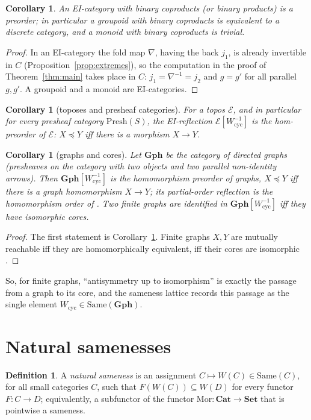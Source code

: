 \documentclass[11pt]{amsart}
\newtheorem{cor}[thm]{Corollary}
\theoremstyle{definition}
\newtheorem{defi}[thm]{Definition}
\newcommand{\Same}{\mathrm{Same}}
\newcommand{\Mor}{\mathrm{Mor}}
\newcommand{\Wcyc}{W_{\mathrm{cyc}}}
\newcommand{\Cat}{\mathbf{Cat}}
\newcommand{\Set}{\mathbf{Set}}
\newcommand{\Presh}{\mathrm{Presh}}
\begin{document}
\begin{cor}\label{cor:EIco}
An EI-category with binary coproducts (or binary products) is a preorder;
in particular a groupoid with binary coproducts is equivalent to a discrete
category, and a monoid with binary coproducts is trivial.
\end{cor}
\begin{proof}
In an EI-category the fold map $\nabla$, having the back $j_1$, is already
invertible in $C$ (Proposition~\ref{prop:extremes}), so the computation in
the proof of Theorem~\ref{thm:main} takes place in $C$: $j_1=\nabla^{-1}=j_2$
and $g=g'$ for all parallel $g,g'$. A groupoid and a monoid are
EI-categories.
\end{proof}

\begin{cor}[toposes and presheaf categories]\label{cor:topos}
For a topos $\mathcal E$, and in particular for every presheaf category
$\Presh(S)$, the EI-reflection $\mathcal E[\Wcyc^{-1}]$ is the hom-preorder
of $\mathcal E$: $X\preceq Y$ iff there is a morphism $X\to Y$.
\end{cor}

\begin{cor}[graphs and cores]\label{cor:graphs}
Let $\mathbf{Gph}$ be the category of directed graphs (presheaves on the
category with two objects and two parallel non-identity arrows). Then
$\mathbf{Gph}[\Wcyc^{-1}]$ is the homomorphism preorder of graphs, $X\preceq Y$
iff there is a graph homomorphism $X\to Y$; its partial-order reflection is
the homomorphism order of \cite{HN}. Two finite graphs are identified in
$\mathbf{Gph}[\Wcyc^{-1}]$ iff they have isomorphic cores.
\end{cor}
\begin{proof}
The first statement is Corollary~\ref{cor:topos}. Finite graphs $X,Y$ are
mutually reachable iff they are homomorphically equivalent, iff their
cores are isomorphic \cite[Ch.~1]{HN}.
\end{proof}

So, for finite graphs, ``antisymmetry up to isomorphism'' is exactly the
passage from a graph to its core, and the sameness lattice records this
passage as the single element $\Wcyc\in\Same(\mathbf{Gph})$.

\section{Natural samenesses}\label{sec:natural}

\begin{defi}
A \emph{natural sameness} is an assignment $C\mapsto W(C)\in\Same(C)$, for all
small categories $C$, such that $F(W(C))\subseteq W(D)$ for every functor
$F\colon C\to D$; equivalently, a subfunctor of the functor
$\Mor\colon\Cat\to\Set$ that is pointwise a sameness.
\end{defi}
\end{document}
